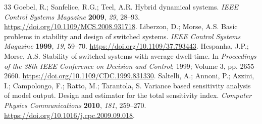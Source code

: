 \begin{thebibliography}{33}
 Goebel, R.; Sanfelice, R.G.; Teel, A.R. Hybrid dynamical systems. \emph{IEEE Control Systems Magazine} \textbf{2009}, \emph{29}, 28--93. \url{https://doi.org/10.1109/MCS.2008.931718}.
 Liberzon, D.; Morse, A.S. Basic problems in stability and design of switched systems. \emph{IEEE Control Systems Magazine} \textbf{1999}, \emph{19}, 59--70. \url{https://doi.org/10.1109/37.793443}.
 Hespanha, J.P.; Morse, A.S. Stability of switched systems with average dwell-time. In \emph{Proceedings of the 38th IEEE Conference on Decision and Control}; 1999; Volume 3, pp. 2655--2660. \url{https://doi.org/10.1109/CDC.1999.831330}.
 Saltelli, A.; Annoni, P.; Azzini, I.; Campolongo, F.; Ratto, M.; Tarantola, S. Variance based sensitivity analysis of model output. Design and estimator for the total sensitivity index. \emph{Computer Physics Communications} \textbf{2010}, \emph{181}, 259--270. \url{https://doi.org/10.1016/j.cpc.2009.09.018}.
\end{thebibliography}
